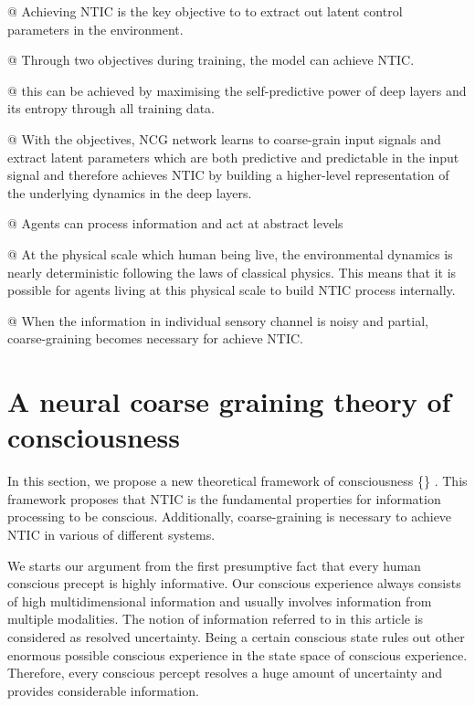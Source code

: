 \documentclass[utf8]{article}
\begin{document}
			\begin{WritingMaterials}
				@ Achieving NTIC is the key objective to to extract out latent control parameters in the environment.

				@ Through two objectives during training, the model can achieve NTIC.

				@ this can be achieved by maximising the self-predictive power of deep layers and its entropy through all training data.

				@ With the objectives, NCG network learns to coarse-grain input signals and  extract latent parameters which are both predictive and predictable in the input signal and therefore achieves NTIC by building a higher-level representation of the underlying dynamics in the deep layers.

				@ Agents can process information and act at abstract levels
			\end{WritingMaterials}


			\begin{WritingMaterials}
				@ At the physical scale which human being live, the environmental dynamics is nearly deterministic following the laws of classical physics. This means that it is possible for agents living at this physical scale to build NTIC process internally.

				@ When the information in individual sensory channel is noisy and partial, coarse-graining becomes necessary for achieve NTIC.
			\end{WritingMaterials}




	\section{A neural coarse graining theory of consciousness}
	


        In this section, we propose a new theoretical framework of consciousness \{\tnamefull\} . This framework proposes that NTIC is the fundamental properties for information processing to be conscious. Additionally, coarse-graining is necessary to achieve NTIC in various of different systems. 

        We starts our argument from the first presumptive fact that every human conscious precept is highly informative. Our conscious experience always consists of high multidimensional information and usually involves information from multiple modalities. The notion of information referred to in this article is considered as resolved uncertainty. Being a certain conscious state rules out other enormous possible conscious experience in the state space of conscious experience. Therefore, every conscious percept resolves a huge amount of uncertainty and provides considerable information. 
        
\end{document}
